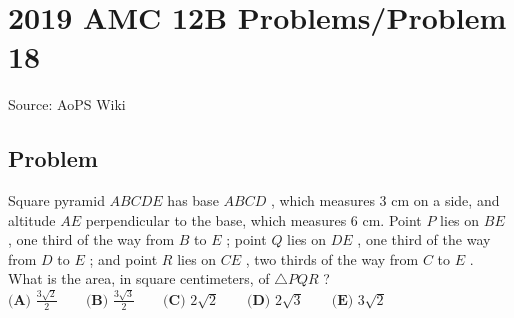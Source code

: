 \documentclass[12pt]{article}
\begin{document}
\section*{{2019 AMC 12B Problems/Problem 18}}
Source: AoPS Wiki

\subsection*{Problem}
Square pyramid $ABCDE$ has base $ABCD$ , which measures $3$ cm on a side, and altitude $AE$ perpendicular to the base, which measures $6$ cm. Point $P$ lies on $BE$ , one third of the way from $B$ to $E$ ; point $Q$ lies on $DE$ , one third of the way from $D$ to $E$ ; and point $R$ lies on $CE$ , two thirds of the way from $C$ to $E$ . What is the area, in square centimeters, of $\triangle{PQR}$ ? $\textbf{(A) } \frac{3\sqrt2}{2} \qquad\textbf{(B) } \frac{3\sqrt3}{2} \qquad\textbf{(C) } 2\sqrt2 \qquad\textbf{(D) } 2\sqrt3 \qquad\textbf{(E) } 3\sqrt2$
\end{document}
